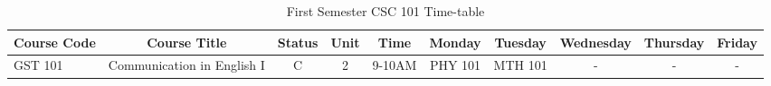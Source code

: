 \documentclass{article}
\begin{document}
	\begin{sidewaystable}[h!]
		\begin{center}
			\caption{First Semester CSC 101 Time-table}
			\label{tab:table1}
			\begin{tabular}{l|c|c|c|c|c|c|c|c|c|}
				\textbf{Course Code} & \textbf{Course Title} & \textbf{Status} & \textbf{Unit} & \textbf{Time} & \textbf{Monday} & \textbf{Tuesday} & \textbf{Wednesday} & \textbf{Thursday} & \textbf{Friday} \\
				\hline
				GST 101 & Communication in English I & C & 2 & 9-10AM & PHY 101 & MTH 101 & - & - & - \\
			\end{tabular}
		\end{center}
	\end{sidewaystable}
\end{document}
